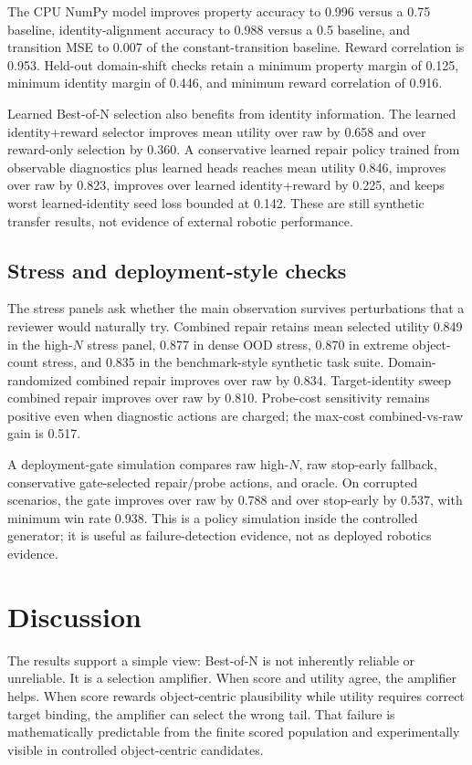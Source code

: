 \documentclass[10pt]{article}
\begin{document}
The CPU NumPy model improves property accuracy to 0.996 versus a 0.75 baseline, identity-alignment accuracy to 0.988 versus a 0.5 baseline, and transition MSE to 0.007 of the constant-transition baseline. Reward correlation is 0.953. Held-out domain-shift checks retain a minimum property margin of 0.125, minimum identity margin of 0.446, and minimum reward correlation of 0.916.

Learned Best-of-N selection also benefits from identity information. The learned identity+reward selector improves mean utility over raw by 0.658 and over reward-only selection by 0.360. A conservative learned repair policy trained from observable diagnostics plus learned heads reaches mean utility 0.846, improves over raw by 0.823, improves over learned identity+reward by 0.225, and keeps worst learned-identity seed loss bounded at 0.142. These are still synthetic transfer results, not evidence of external robotic performance.

\subsection{Stress and deployment-style checks}

The stress panels ask whether the main observation survives perturbations that a reviewer would naturally try. Combined repair retains mean selected utility 0.849 in the high-$N$ stress panel, 0.877 in dense OOD stress, 0.870 in extreme object-count stress, and 0.835 in the benchmark-style synthetic task suite. Domain-randomized combined repair improves over raw by 0.834. Target-identity sweep combined repair improves over raw by 0.810. Probe-cost sensitivity remains positive even when diagnostic actions are charged; the max-cost combined-vs-raw gain is 0.517.

A deployment-gate simulation compares raw high-$N$, raw stop-early fallback, conservative gate-selected repair/probe actions, and oracle. On corrupted scenarios, the gate improves over raw by 0.788 and over stop-early by 0.537, with minimum win rate 0.938. This is a policy simulation inside the controlled generator; it is useful as failure-detection evidence, not as deployed robotics evidence.

\section{Discussion}

The results support a simple view: Best-of-N is not inherently reliable or unreliable. It is a selection amplifier. When score and utility agree, the amplifier helps. When score rewards object-centric plausibility while utility requires correct target binding, the amplifier can select the wrong tail. That failure is mathematically predictable from the finite scored population and experimentally visible in controlled object-centric candidates.
\end{document}
